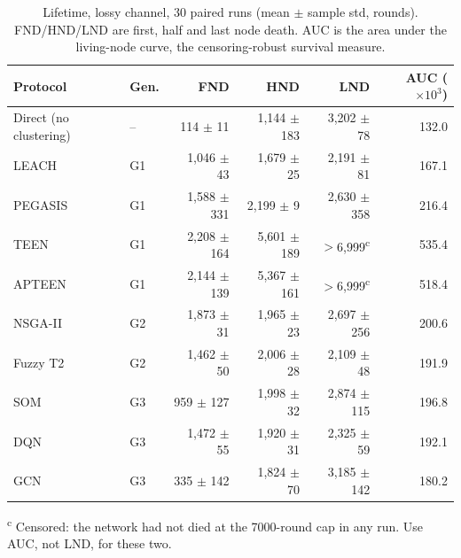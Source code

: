 \begin{table}[!t]
\caption{Lifetime, lossy channel, 30 paired runs (mean $\pm$ sample std, rounds). FND/HND/LND are first, half and last node death. AUC is the area under the living-node curve, the censoring-robust survival measure.}
\label{tab:lifetime}
\centering
\begin{tabular}{llrrrr}
\toprule
Protocol & Gen. & FND & HND & LND & AUC ($\times 10^3$) \\
\midrule
Direct (no clustering) & -- & 114 $\pm$ 11 & 1,144 $\pm$ 183 & 3,202 $\pm$ 78 & 132.0 \\
LEACH & G1 & 1,046 $\pm$ 43 & 1,679 $\pm$ 25 & 2,191 $\pm$ 81 & 167.1 \\
PEGASIS & G1 & 1,588 $\pm$ 331 & 2,199 $\pm$ 9 & 2,630 $\pm$ 358 & 216.4 \\
TEEN & G1 & 2,208 $\pm$ 164 & 5,601 $\pm$ 189 & $>$6,999\textsuperscript{c} & 535.4 \\
APTEEN & G1 & 2,144 $\pm$ 139 & 5,367 $\pm$ 161 & $>$6,999\textsuperscript{c} & 518.4 \\
NSGA-II & G2 & 1,873 $\pm$ 31 & 1,965 $\pm$ 23 & 2,697 $\pm$ 256 & 200.6 \\
Fuzzy T2 & G2 & 1,462 $\pm$ 50 & 2,006 $\pm$ 28 & 2,109 $\pm$ 48 & 191.9 \\
SOM & G3 & 959 $\pm$ 127 & 1,998 $\pm$ 32 & 2,874 $\pm$ 115 & 196.8 \\
DQN & G3 & 1,472 $\pm$ 55 & 1,920 $\pm$ 31 & 2,325 $\pm$ 59 & 192.1 \\
GCN & G3 & 335 $\pm$ 142 & 1,824 $\pm$ 70 & 3,185 $\pm$ 142 & 180.2 \\
\bottomrule
\end{tabular}

{\footnotesize \textsuperscript{c} Censored: the network had not died at the 7000-round cap in any run. Use AUC, not LND, for these two.\par}
\end{table}
